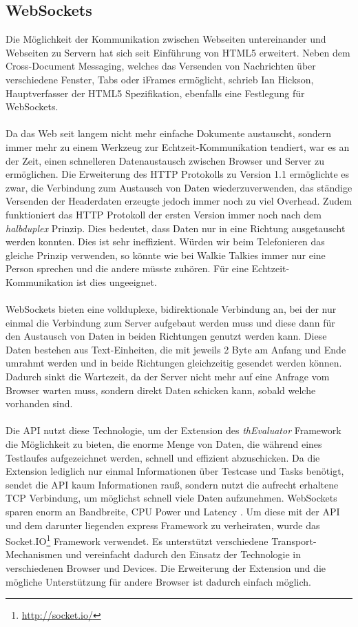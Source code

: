 \subsection{WebSockets}

Die Möglichkeit der Kommunikation zwischen Webseiten untereinander und Webseiten zu Servern hat sich seit Einführung von HTML5 erweitert. Neben dem Cross-Document Messaging, welches das Versenden von Nachrichten über verschiedene Fenster, Tabs oder iFrames ermöglicht, schrieb Ian Hickson, Hauptverfasser der HTML5 Spezifikation, ebenfalls eine Festlegung für WebSockets.\\
\\
Da das Web seit langem nicht mehr einfache Dokumente austauscht, sondern immer mehr zu einem Werkzeug zur Echtzeit-Kommunikation tendiert, war es an der Zeit, einen schnelleren Datenaustausch zwischen Browser und Server zu ermöglichen. Die Erweiterung des HTTP Protokolls zu Version 1.1 ermöglichte es zwar, die Verbindung zum Austausch von Daten wiederzuverwenden, das ständige Versenden der Headerdaten erzeugte jedoch immer noch zu viel Overhead. Zudem funktioniert das HTTP Protokoll der ersten Version immer noch nach dem \textit{halbduplex} Prinzip. Dies bedeutet, dass Daten nur in eine Richtung ausgetauscht werden konnten. Dies ist sehr ineffizient. Würden wir beim Telefonieren das gleiche Prinzip verwenden, so könnte wie bei Walkie Talkies immer nur eine Person sprechen und die andere müsste zuhören. Für eine Echtzeit-Kommunikation ist dies ungeeignet.\\
\\
WebSockets bieten eine vollduplexe, bidirektionale Verbindung an, bei der nur einmal die Verbindung zum Server aufgebaut werden muss und diese dann für den Austausch von Daten in beiden Richtungen genutzt werden kann. Diese Daten bestehen aus Text-Einheiten, die mit jeweils 2 Byte am Anfang und Ende umrahmt werden und in beide Richtungen gleichzeitig gesendet werden \cite{socketsbirectional} können. Dadurch sinkt die Wartezeit, da der Server nicht mehr auf eine Anfrage vom Browser warten muss, sondern direkt Daten schicken kann, sobald welche vorhanden sind. \\
\\
Die API nutzt diese Technologie, um der Extension des \textit{thEvaluator} Framework die Möglichkeit zu bieten, die enorme Menge von Daten, die während eines Testlaufes aufgezeichnet werden, schnell und effizient abzuschicken. Da die Extension lediglich nur einmal Informationen über Testcase und Tasks benötigt, sendet die API kaum Informationen rauß, sondern nutzt die aufrecht erhaltene TCP Verbindung, um möglichst schnell viele Daten aufzunehmen. WebSockets sparen enorm an Bandbreite, CPU Power und Latency \cite{websockets}. Um diese mit der API und dem darunter liegenden express Framework zu verheiraten, wurde das Socket.IO\footnote{\url{http://socket.io/}} Framework verwendet. Es unterstützt verschiedene Transport-Mechanismen und vereinfacht dadurch den Einsatz der Technologie in verschiedenen Browser und Devices. Die Erweiterung der Extension und die mögliche Unterstützung für andere Browser ist dadurch einfach möglich.\\
